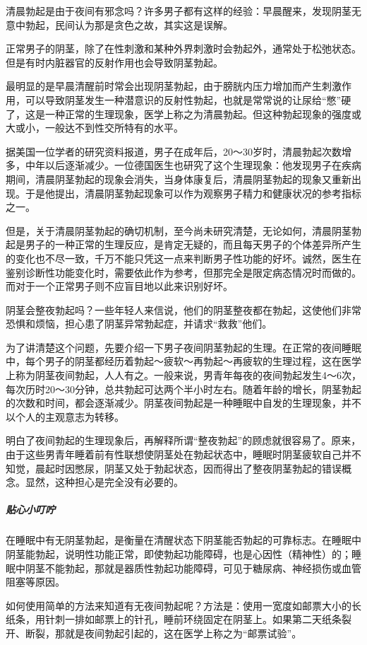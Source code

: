 清晨勃起是由于夜间有邪念吗？许多男子都有这样的经验：早晨醒来，发现阴茎无意中勃起，民间认为那是贪色之故，其实这是误解。

正常男子的阴茎，除了在性刺激和某种外界刺激时会勃起外，通常处于松弛状态。但是有时内脏器官的反射作用也会导致阴茎勃起。

最明显的是早晨清醒前时常会出现阴茎勃起，由于膀胱内压力增加而产生刺激作用，可以导致阴茎发生一种潜意识的反射性勃起，也就是常常说的让尿给“憋”硬了，这是一种正常的生理现象，医学上称之为清晨勃起。但这种勃起现象的强度或大或小，一般达不到性交所特有的水平。

据美国一位学者的研究资料报道，男子在成年后，20～30岁时，清晨勃起次数增多，中年以后逐渐减少。一位德国医生也研究了这个生理现象：他发现男子在疾病期间，清晨阴茎勃起的现象会消失，当身体康复后，清晨阴茎勃起的现象又重新出现。于是他提出，清晨阴茎勃起现象可以作为观察男子精力和健康状况的参考指标之一。

但是，关于清晨阴茎勃起的确切机制，至今尚未研究清楚，无论如何，清晨阴茎勃起是男子的一种正常的生理反应，是肯定无疑的，而且每天男子的个体差异所产生的变化也不尽一致，千万不能只凭这一点来判断男子性功能的好坏。诚然，医生在鉴别诊断性功能变化时，需要依此作为参考，但那完全是限定病态情况时而做的。而对于一个正常男子则不应盲目地以此来识别好坏。

阴茎会整夜勃起吗？一些年轻人来信说，他们的阴茎整夜都在勃起，这使他们非常恐惧和烦恼，担心患了阴茎异常勃起症，并请求“救救”他们。

为了讲清楚这个问题，先要介绍一下男子夜间阴茎勃起的生理。在正常的夜间睡眠中，每个男子的阴茎都经历着勃起～疲软～再勃起～再疲软的生理过程，这在医学上称为阴茎夜间勃起，人人有之。一般来说，男青年每夜的夜间勃起发生4～6次，每次历时20～30分钟，总共勃起可达两个半小时左右。随着年龄的增长，阴茎勃起的次数和时间，都会逐渐减少。阴茎夜间勃起是一种睡眠中自发的生理现象，并不以个人的主观意志为转移。

明白了夜间勃起的生理现象后，再解释所谓“整夜勃起”的顾虑就很容易了。原来，由于这些男青年睡着前有性联想使阴茎处在勃起状态中，睡眠时阴茎疲软自己并不知觉，晨起时因憋尿，阴茎又处于勃起状态，因而得出了整夜阴茎勃起的错误概念。显然，这种担心是完全没有必要的。

\subparagraph{贴心小叮咛}

在睡眠中有无阴茎勃起，是衡量在清醒状态下阴茎能否勃起的可靠标志。在睡眠中阴茎能勃起，说明性功能正常，即使勃起功能障碍，也是心因性（精神性）的；睡眠中阴茎不能勃起，那就是器质性勃起功能障碍，可见于糖尿病、神经损伤或血管阻塞等原因。

如何使用简单的方法来知道有无夜间勃起呢？方法是：使用一宽度如邮票大小的长纸条，用针刺一排如邮票上的针孔，睡前环绕固定在阴茎上。如果第二天纸条裂开、断裂，那就是夜间勃起引起的，这在医学上称之为“邮票试验”。

